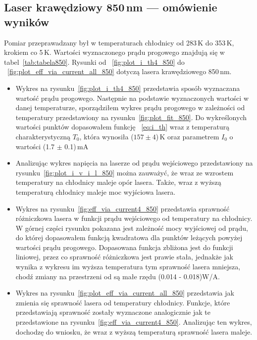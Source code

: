 \newpage
\subsection{Laser krawędziowy 850\,nm --- omówienie wyników}
Pomiar przeprawadzany był w temperaturach chłodnicy od 283\,K do 353\,K, krokiem co 5\,K. Wartości wyznaczonego prądu progowego
znajdują się w tabel~\ref{tab:tabela850}. Rysunki od ~\ref{fig:plot_i_th4_850} do ~\ref{fig:plot_eff_via_current_all_850} dotyczą lasera
krawędziowego 850\,nm.
\begin{itemize}
\item Wykres na rysunku~\ref{fig:plot_i_th4_850} przedstawia sposób wyznaczana wartość prądu progowego. Następnie na podstawie
wyznaczonych wartości w danej temperaturze, sporządziłem wykres prądu progowego w zależności od temperatury
przedstawiony na rysunku~\ref{fig:plot_fit_850}. Do wykreślonych wartości punktów dopasowałem funkcję ~\ref{eq:i_th} wraz z temperaturą charakterystyczną
$T_0$, która wynosiła ($157 \pm 4$)\,K oraz parametrem $I_0$ o wartości (1.7 $\pm$ 0.1)\,mA
\item Analizując wykres napięcia na laserze od prądu wejściowego przedstawiony na rysunku~\ref{fig:plot_i_v_i_l_850}
można zauważyć, że wraz ze wzrostem temperatury na chłodnicy
maleje opór lasera. Także, wraz z wyższą temperaturą chłodnicy maleje moc wyjściowa lasera.
\item Wykres na rysunku~\ref{fig:eff_via_current4_850} przedstawia sprawność różniczkowa lasera w funkcji prądu wejściowego
od temperatury na chłodnicy. W górnej części rysunku pokazana jest zależność mocy wyjściowej od prądu, do której dopasowałem
funkcją kwadratowa dla punktów leżących powyżej wartości prądu progowego. Dopasowana funkcja zbliżona jest do funkcji liniowej, przez co sprawność różniczkowa jest
prawie stała, jednakże jak wynika z wykresu im wyższa temperatura tym sprawność lasera mniejsza, chodź zmiany na
przestrzeni od są małe rzędu (0.014 - 0.018)W/A.
\item Wykres na rysunku~\ref{fig:plot_eff_via_current_all_850} przedstawia jak zmienia się sprawność lasera od temperatury chłodnicy.
Funkcje, które przedstawiają sprawność zostały wyznaczone analogicznie jak te przedstawione na rysunku~\ref{fig:eff_via_current4_850}.
Analizując ten wykres, dochodzę do wniosku, że wraz z wyższą temperaturą sprawność lasera maleje.
\end{itemize}
